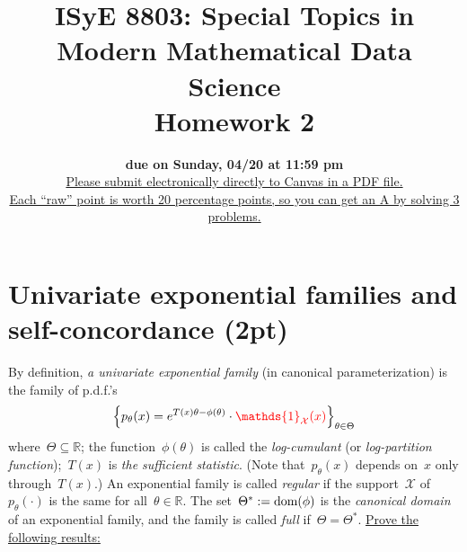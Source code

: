 \documentclass[11pt]{article}
\title{ISyE 8803: Special Topics in Modern Mathematical Data Science\\ 
	   Homework 2}
\date{
\vspace{-0.3cm}
{\bf due on Sunday, 04/20 at 11:59 pm}\\
\vspace{0.3cm}
\underline{Please submit electronically directly to Canvas in a PDF file.}\\
\underline{Each ``raw'' point is worth 20 percentage points, so you can get an A by solving 3 problems.}
}
\author{}
\newcommand{\proofstep}[1]{$\boldsymbol{{#1}^o}$}
\newcommand{\odima}[1]{{\color{red} #1}}
\newcommand{\R}{\mathds{R}}
\newcommand{\E}{\mathds{E}}
\newcommand{\Cov}{\textup{Cov}}
\newcommand{\cX}{\mathcal{X}}
\newcommand{\bSigma}{\boldsymbol{\Sigma}}
\newcommand{\bId}{\boldsymbol{I}}
\begin{document}
\maketitle
\newcommand{\vsp}{\vspace{0.3cm}}

%


\newpage
\noindent 

\section{Univariate exponential families and self-concordance (2pt)}
By definition, {\em a univariate exponential family} (in canonical parameterization) is the family of p.d.f.'s
\[
\left\{ p_{\theta}(x) = e^{ T(x) \theta - \phi(\theta) } \cdot \odima{\mathds{1}_{\cX}(x)} \right\}_{\theta \in \Theta} 
\]
where~$\Theta \subseteq \R$; the function~$\phi(\theta)$ is called the {\em log-cumulant} (or {\em log-partition function});~$T(x)$ is {\em the sufficient statistic}. 
(Note that~$p_{\theta}(x)$ depends on~$x$ only through~$T(x)$.)
An exponential family is called {\em regular} if the support~$\cX$ of~$p_{\theta}(\cdot)$ is the same for all~$\theta \in \R$. 
The set~$\Theta^* := \textup{dom}(\phi)$ is the {\em canonical domain} of an exponential family, and the family is called {\em full} if~$\Theta = \Theta^*$.
\underline{Prove the following results:}
\end{document}
